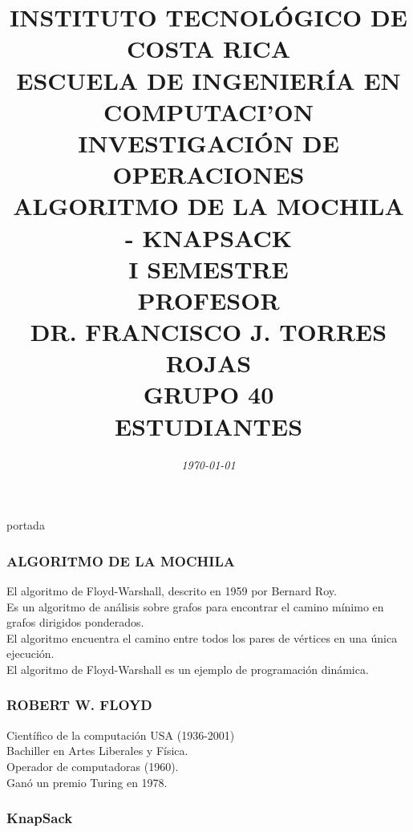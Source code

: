 \documentclass[10]{beamer}
\title{{\color{WHITE} \large \textbf{INSTITUTO TECNOL\'OGICO DE COSTA RICA}} \\ \vspace{0.02cm} 
{\color{WHITE} \large \textbf{ESCUELA DE INGENIER\'IA EN COMPUTACI'ON }} \\ \vspace{0.02cm} 
{\color{WHITE} \large \textbf{INVESTIGACI\'ON DE OPERACIONES  }} \\ \vspace{0.02cm} 
{\color{WHITE} \large \textbf{ALGORITMO DE LA MOCHILA - KNAPSACK  }} \\ \vspace{0.02cm} 
{\color{WHITE} \large \textbf{I SEMESTRE  }}\\ \vspace{0.02cm}
{\color{WHITE} \large \textbf{PROFESOR}} \\ \vspace{0.02cm}
{\color{WHITE} \large DR. FRANCISCO J. TORRES ROJAS  } \\ \vspace{0.02cm}
{\color{WHITE} \large \textbf{GRUPO 40}} \\ \vspace{0.01cm}
{\color{WHITE} \large \textbf{ESTUDIANTES} }}
\date{\em \color{WHITE} \today}
\begin{document}
\begin{frame}
\color{white}
\titlepage portada
\end{frame} 
\begin{frame}
\color{white}
\frametitle{ALGORITMO DE LA MOCHILA}
El algoritmo de Floyd-Warshall, descrito en 1959 por Bernard Roy.
\\Es un algoritmo de análisis sobre grafos para encontrar el camino mínimo en grafos dirigidos ponderados.
\\El algoritmo encuentra el camino entre todos los pares de vértices en una única ejecución.
\\ El algoritmo de Floyd-Warshall es un ejemplo de programación dinámica.
\end{frame} 
\begin{frame}
\color{white}
\frametitle{ROBERT W. FLOYD}
Cient\'ifico de la computaci\'on USA (1936-2001)\\
Bachiller en Artes Liberales y F\'isica. \\ Operador de computadoras (1960). \\ Gan\'o un premio Turing en 1978.
\end{frame} 
\begin{frame}\frametitle{KnapSack}
 \color{white}
\end{frame} 
\end{document}
